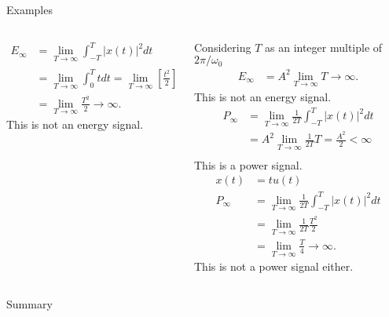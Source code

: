 \begin{frame}{Examples}
\begin{columns}[t]
\begin{column}{0.5\textwidth}
\begin{overprint}
\begin{align*}
                    E_\infty &=  \lim_{T\rightarrow \infty}\int_{-T}^{T}|x(t)|^2dt\\
                    &= \lim_{T\rightarrow \infty}\int_{0}^{T} tdt
                    = \lim_{T\rightarrow \infty} \left[\frac{t^2}{2}\right]_0^T\\
                    &= \lim_{T\rightarrow \infty}\frac{T^2}{2} \rightarrow \infty.
                \end{align*}
                This is not an energy signal.
            \end{overprint}
        \end{column}
        \begin{column}{0.5\textwidth}
            \begin{overprint}
                Considering $T$ as an integer multiple of $2\pi/\omega_0$
                \begin{align*}
                    E_\infty &= A^2\lim_{T\rightarrow \infty}T \rightarrow \infty.
                \end{align*}
                This is not an energy signal.
                \begin{align*}
                    P_\infty &= \lim_{T\rightarrow \infty} \frac{1}{2T}\int_{-T}^{T}|x(t)|^2dt\\
                    &= A^2\lim_{T\rightarrow \infty}\frac{1}{2T}T  = \frac{A^2}{2} < \infty\\
                \end{align*}
                This is a power signal.
                \begin{align*}
                    x(t) &= tu(t)\\
                    P_\infty &=  \lim_{T\rightarrow \infty}\frac{1}{2T}\int_{-T}^{T}|x(t)|^2dt\\
                    &= \lim_{T\rightarrow \infty}\frac{1}{2T}\frac{T^2}{2}\\
                    &= \lim_{T\rightarrow \infty}\frac{T}{4} \rightarrow \infty.
                \end{align*}
                This is not a power signal either.
            \end{overprint}
        \end{column}
    \end{columns}
\end{frame} 


\begin{frame}{Summary}
\end{frame}